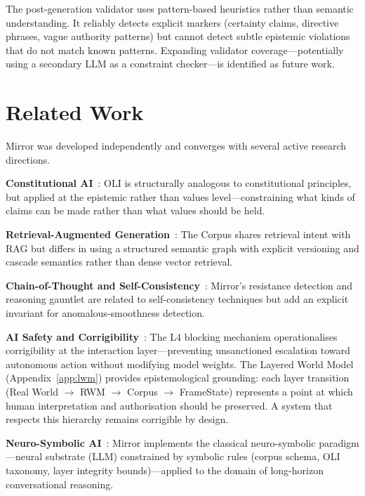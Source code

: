 \documentclass[11pt,a4paper]{article}
\begin{document}
The post-generation validator uses pattern-based heuristics rather than semantic understanding.
It reliably detects explicit markers (certainty claims, directive phrases, vague authority patterns) but cannot detect subtle epistemic violations that do not match known patterns.
Expanding validator coverage---potentially using a secondary LLM as a constraint checker---is identified as future work.

\section{Related Work}
\label{sec:related}

Mirror was developed independently and converges with several active research directions.

\textbf{Constitutional AI}~\citep{bai2022constitutional}: OLI is structurally analogous to constitutional principles, but applied at the epistemic rather than values level---constraining what kinds of claims can be made rather than what values should be held.

\textbf{Retrieval-Augmented Generation}~\citep{lewis2020rag}: The Corpus shares retrieval intent with RAG but differs in using a structured semantic graph with explicit versioning and cascade semantics rather than dense vector retrieval.

\textbf{Chain-of-Thought and Self-Consistency}~\citep{wei2022chain,wang2023selfconsistency}: Mirror's resistance detection and reasoning gauntlet are related to self-consistency techniques but add an explicit invariant for anomalous-smoothness detection.

\textbf{AI Safety and Corrigibility}~\citep{soares2015corrigibility}: The L4 blocking mechanism operationalises corrigibility at the interaction layer---preventing unsanctioned escalation toward autonomous action without modifying model weights.
The Layered World Model (Appendix~\ref{app:lwm}) provides epistemological grounding: each layer transition (Real World $\to$ RWM $\to$ Corpus $\to$ FrameState) represents a point at which human interpretation and authorisation should be preserved.
A system that respects this hierarchy remains corrigible by design.

\textbf{Neuro-Symbolic AI}~\citep{marcus2020next,garcez2019neurosymbolic}: Mirror implements the classical neuro-symbolic paradigm---neural substrate (LLM) constrained by symbolic rules (corpus schema, OLI taxonomy, layer integrity bounds)---applied to the domain of long-horizon conversational reasoning.
\end{document}
